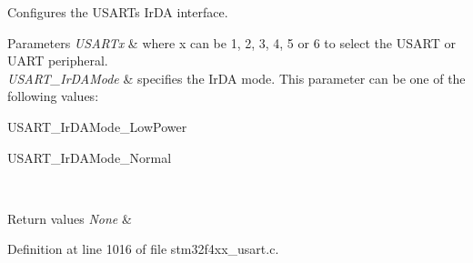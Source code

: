 Configures the U\+S\+A\+RT\textquotesingle{}s Ir\+DA interface. 


\begin{DoxyParams}{Parameters}
{\em U\+S\+A\+R\+Tx} & where x can be 1, 2, 3, 4, 5 or 6 to select the U\+S\+A\+RT or U\+A\+RT peripheral. \\
\hline
{\em U\+S\+A\+R\+T\+\_\+\+Ir\+D\+A\+Mode} & specifies the Ir\+DA mode. This parameter can be one of the following values\+: \begin{DoxyItemize}
\item U\+S\+A\+R\+T\+\_\+\+Ir\+D\+A\+Mode\+\_\+\+Low\+Power \item U\+S\+A\+R\+T\+\_\+\+Ir\+D\+A\+Mode\+\_\+\+Normal \end{DoxyItemize}
\\
\hline
\end{DoxyParams}

\begin{DoxyRetVals}{Return values}
{\em None} & \\
\hline
\end{DoxyRetVals}


Definition at line 1016 of file stm32f4xx\+\_\+usart.\+c.

